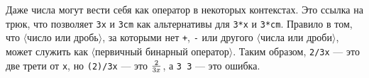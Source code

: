 \documentclass{article} %
\newcommand\invisgap{\nobreak\hskip0pt\relax}
\newcommand\tdescr[1]{$\langle$\invisgap#1\invisgap$\rangle$}
\begin{document}
Даже числа могут вести себя как оператор в некоторых контекстах.
Это ссылка на трюк, что позволяет {\tt 3x} и 
{\tt 3cm} как альтернативы для {\tt 3*x} и {\tt 3*cm}.
Правило в том, что \tdescr{число или дробь}, за которыми нет {\tt +}, {\tt -} 
или другого \tdescr{числа или дроби}, может служить как \tdescr{первичный 
бинарный оператор}. 
Таким образом, {\tt 2/3x} --- это две трети от 
{\tt x}, но {\tt (2)/3x} --- это $2\over3x$, а {\tt 3 3} --- это ошибка.
\end{document}
